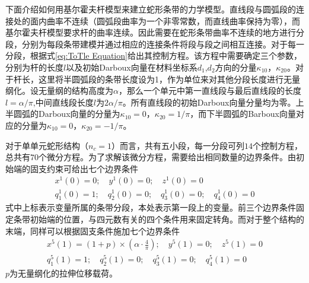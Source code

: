 下面介绍如何用基尔霍夫杆模型来建立蛇形条带的力学模型。直线段与圆弧段的连接处的面内曲率不连续（圆弧段曲率为一个非零常数，而直线曲率保持为零），而基尔霍夫杆模型要求杆的曲率连续。因此需要在蛇形条带曲率不连续的地方进行分段，分别为每段条带建模并通过相应的连接条件将段与段之间相互连接。对于每一分段，根据式\eqref{eq:ToTle Equation}给出其控制方程。该方程中需要确定三个参数，分别为杆的长度$l$以及初始Darboux向量在材料坐标系$d_1$,$d_2$方向的分量$\kappa_{10}$，$\kappa_{20}$。对于杆长，这里将半圆弧段的条带长度设为1，作为单位来对其他分段长度进行无量纲化。设无量纲的结构高度为$\alpha$，那么一个单元中第一直线段与最后直线段的长度$l=\alpha/\pi$,中间直线段长度$l$为$2\alpha/\pi$。所有直线段的初始Darboux向量分量均为零。上半圆弧的Darboux向量的分量为$\kappa_{10}=0$，$\kappa_{20}=1/\pi$，而下半圆弧的Barboux向量对应的分量为$\kappa_{10}=0$，$\kappa_{20}=-1/\pi$。

对于单单元蛇形结构（$n_c=1$）而言，共有五小段，每一分段可列$14$个控制方程，总共有$70$个微分方程。为了求解该微分方程，需要给出相同数量的边界条件。由初始端的固支约束可给出七个边界条件
\begin{equation}
	\begin{gathered}
	x^1(0)=0;\quad y^1(0)=0;\quad z^1(0)=0\\
	q^1_1(0)=1;\quad q^1_2(0)=0;\quad q^1_3(0)=0;\quad q^1_4(0)=0
\end{gathered}
\end{equation}
式中上标表示变量所属的条带分段，本处表示第一段上的变量。前三个边界条件固定条带初始端的位置，与四元数有关的四个条件用来固定转角。而对于整个结构的末端，同样可以根据固支条件施加七个边界条件
\begin{equation}
	\begin{gathered}
		x^5(1)=(1+p)\times\left(\alpha\cdot\frac{4}{\pi}\right);\quad y^5(1)=0;\quad z^5(1)=0\\
		q^5_1(1)=1;\quad q^5_2(1)=0;\quad q^5_3(1)=0;\quad q^5_4(1)=0
	\end{gathered}
\end{equation}
$p$为无量纲化的拉伸位移载荷。

